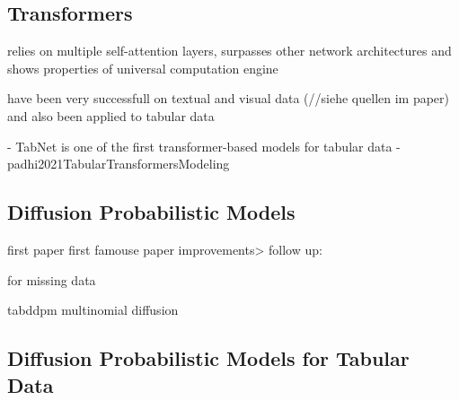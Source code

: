 \subsection{Transformers}
\label{ch:preliminaries-generativeAlgorithms-transformers}
relies on multiple self-attention layers, surpasses other network architectures and shows properties of universal computation engine \cite{li2022TTSGANTransformerbasedTimeSeries}

have been very successfull on textual and visual data (//siehe quellen im paper) \cite{borisov2022DeepNeuralNetworks} and also been applied to tabular data \cite{padhi2021TabularTransformersModeling} \cite{gorishniy2022EmbeddingsNumericalFeatures}




- TabNet is one of the first transformer-based models for tabular data \cite{borisov2022DeepNeuralNetworks}
- padhi2021TabularTransformersModeling

\subsection{Diffusion Probabilistic Models}
\label{ch:preliminaries-generativeAlgorithms-diffusionProbabilisticModels}

first paper \cite{sohl-dickstein2015DeepUnsupervisedLearning}
first famouse paper \cite{ho2020DenoisingDiffusionProbabilistic}
improvements> \cite{nichol2021ImprovedDenoisingDiffusion}
follow up: \cite{dhariwal2021DiffusionModelsBeat}

\cite{ho2022ClassifierFreeDiffusionGuidance}

\cite{rombach2022HighResolutionImageSynthesis}



\cite{zheng2022DiffusionModelsMissing} for missing data

\cite{kotelnikov2022TabDDPMModellingTabular} tabddpm
\cite{hoogeboom2021ArgmaxFlowsMultinomial} multinomial diffusion


\subsection{Diffusion Probabilistic Models for Tabular Data}
\label{ch:preliminaries-generativeAlgorithms-diffusionProbabilisticModelsTabularData}

